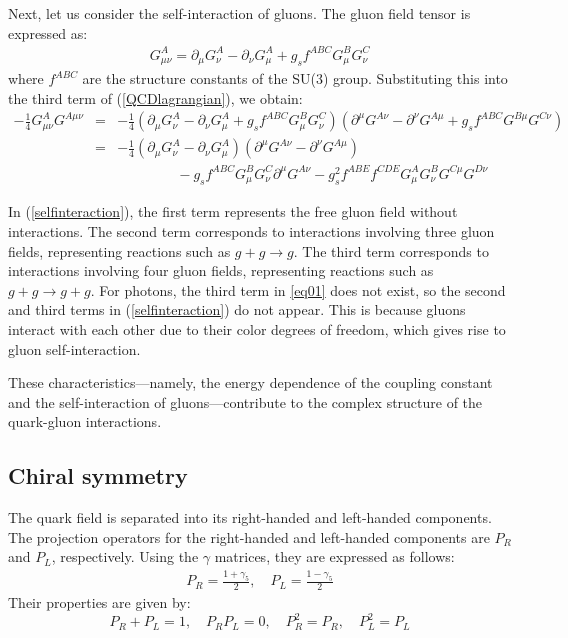         Next, let us consider the self-interaction of gluons. The gluon field tensor is expressed as:  
        \begin{eqnarray}
        \label{eq01}
            G^A_{\mu\nu} = \partial_\mu G^A_\nu - \partial_\nu G^A_\mu + g_s f^{ABC}G^B_\mu G^C_\nu
        \end{eqnarray}  
        where $f^{ABC}$ are the structure constants of the SU(3) group. Substituting this into the third term of (\ref{QCDlagrangian}), we obtain:  
        \begin{eqnarray}
            -\frac{1}{4}G^A_{\mu\nu} G^{A\mu\nu} &=& -\frac{1}{4}(\partial_\mu G^A_\nu - \partial_\nu G^A_\mu + g_s f^{ABC} G^B_\mu G^C_\nu)(\partial^\mu G^{A\nu} - \partial^{\nu} G^{A\mu} + g_s f^{ABC} G^{B\mu} G^{C\nu})\\ 
            \nonumber
            &=& -\frac{1}{4}(\partial_\mu G^A_\nu - \partial_\nu G^A_\mu)(\partial^\mu G^{A\nu} - \partial^{\nu} G^{A\mu}) \\
            \label{selfinteraction}
            && \qquad\qquad\ - g_s f^{ABC}G^B_\mu G^C_\nu \partial^\mu G^{A\nu} - g_s^2 f^{ABE}f^{CDE}G^A_\mu G^B_\nu G^{C\mu}G^{D\nu}
        \end{eqnarray}  
        
        In (\ref{selfinteraction}), the first term represents the free gluon field without interactions. The second term corresponds to interactions involving three gluon fields, representing reactions such as $g+g \rightarrow g$. The third term corresponds to interactions involving four gluon fields, representing reactions such as $g+g \rightarrow g+g$. For photons, the third term in \eqref{eq01} does not exist, so the second and third terms in (\ref{selfinteraction}) do not appear. This is because gluons interact with each other due to their color degrees of freedom, which gives rise to gluon self-interaction.  
        
        These characteristics—namely, the energy dependence of the coupling constant and the self-interaction of gluons—contribute to the complex structure of the quark-gluon interactions.
    \subsection{Chiral symmetry}
    \label{Intro:Chiral_symmetry}  
        The quark field is separated into its right-handed and left-handed components. The projection operators for the right-handed and left-handed components are $P_R$ and $P_L$, respectively. Using the $\gamma$ matrices, they are expressed as follows:  
        \begin{eqnarray}  
            P_R = \frac{1+\gamma_5}{2}, \quad P_L = \frac{1-\gamma_5}{2} 
        \end{eqnarray}  
        Their properties are given by:  
        \begin{equation}  
            P_R + P_L = 1, \quad P_R P_L = 0, \quad P_R^2 = P_R, \quad P_L^2 = P_L  
        \end{equation}  
        
